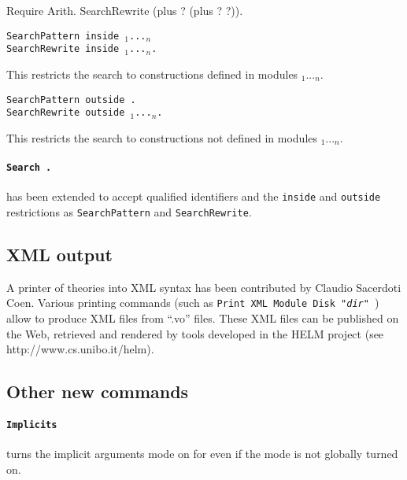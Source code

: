 \documentclass[11pt]{article}
\begin{document}
\begin{coq_example}
Require Arith.
SearchRewrite (plus ? (plus ? ?)).
\end{coq_example}

\begin{Variants}

\item {\tt SearchPattern {\term} inside {\module$_1$}...{\module$_n$}}\\
{\tt SearchRewrite {\term} inside
{\module$_1$}...{\module$_n$}.}

  This restricts the search to constructions defined in modules {\module$_1$}...{\module$_n$}.

\item {\tt SearchPattern {\term} outside {\module}.}\\
{\tt SearchRewrite {\term} outside {\module$_1$}...{\module$_n$}.}

  This restricts the search to constructions not defined in modules {\module$_1$}...{\module$_n$}.

\end{Variants}

\paragraph{{\tt Search {\ident}.}} has been extended to accept qualified
identifiers and the {\tt inside} and {\tt outside} restrictions as
{\tt SearchPattern} and {\tt SearchRewrite}.

\subsection{XML output}
\label{XML}

A printer of {\Coq} theories into XML syntax has been contributed by
Claudio Sacerdoti Coen. Various printing commands (such as {\tt Print
XML Module Disk "{\it dir}" {\ident}}) allow to produce XML files from
``.vo'' files. These XML files can be published on the Web, retrieved
and rendered by tools developed in the HELM project (see
http://www.cs.unibo.it/helm).

\subsection{Other new commands}


  \paragraph{{\tt Implicits {\ident}}} turns the implicit arguments
  mode on for {\ident} even if the mode is not globally turned on.
\end{document}
